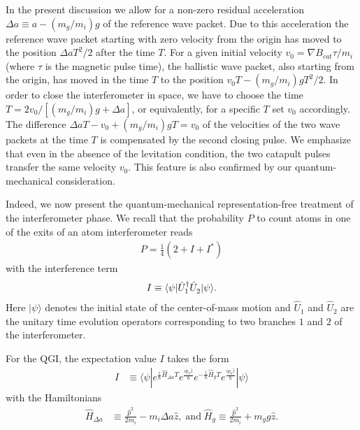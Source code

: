\documentclass[aps,prx,onecolumn,superscriptaddress,longbibliography]{revtex4-2}
\newcommand{\bra}[1]{\mbox{$\langle#1|$}}
\newcommand{\ket}[1]{\mbox{$|#1\rangle$}}
\begin{document}
In the present discussion we allow for a non-zero residual acceleration $\Delta a\equiv a -(m_g/m_i) g$ of the reference wave packet. Due to this acceleration the reference wave packet starting with zero velocity from the origin has moved to the position $\Delta aT^2/2$ after the time $T$. For a given initial velocity $v_0=\nabla B_{cat}\tau/m_i$ (where $\tau$ is the magnetic pulse time), the ballistic wave packet, also starting from the origin, has moved in the time $T$ to the position $v_0T-(m_g/m_i)gT^2/2$. In order to close the interferometer in space, we have to choose the time $T=2v_0/[(m_g/m_i)g+\Delta a]$, or equivalently, for a specific $T$ set $v_0$ accordingly. The difference $\Delta a T-v_0+(m_g/m_i)gT=v_0$ of the velocities of the two wave packets at the time $T$ is compensated by the second closing pulse. We emphasize that even in the absence of the levitation condition, the two catapult pulses transfer the same velocity $v_0$. This feature is also confirmed by our quantum-mechanical consideration.

Indeed, we now present the quantum-mechanical representation-free treatment \cite{Schleich-NJP,Schleich-PRL} of the interferometer phase. We recall \cite{Schleich-NJP, Schleich-PRL} that the probability $P$ to count atoms in one of the exits of an atom interferometer reads
\begin{align}
    P = \frac{1}{4} \left( 2 + I + I^*\right)
    \label{Eq:CountProb}
\end{align}
with the interference term
\begin{align}
    I\equiv\bra{\psi}  \hat{U}_1^\dagger \hat{U}_2^{\vphantom{\dagger}} \ket{\psi}.
    \label{Eq:InterferenceTerm}
\end{align}
Here $\ket{\psi}$ denotes the initial state of the center-of-mass motion and $\hat{U}_1$ and $\hat{U}_2$ are the unitary time evolution operators corresponding to two branches $1$ and $2$ of the interferometer.

For the QGI, the expectation value $I$ takes the form
\begin{align}
    I &\equiv \langle \psi | e^{\frac{i}{\hbar} \hat{H}_{\Delta a} T} e^{\frac{i p_0 \hat{z}}{\hbar}} e^{-\frac{i}{\hbar} \hat{H}_g T} e^{\frac{i p_0 \hat{z}}{\hbar}} | \psi\rangle
\end{align}
with the Hamiltonians
\begin{align}
    \hat{H}_{\Delta a} &\equiv \frac{\hat{p}^2}{2m_i}- m_i \Delta a\hat{z},\;\text{and}\; \hat{H}_g \equiv \frac{\hat{p}^2}{2m_i} + m_g g\hat{z}.
\end{align}
\end{document}
